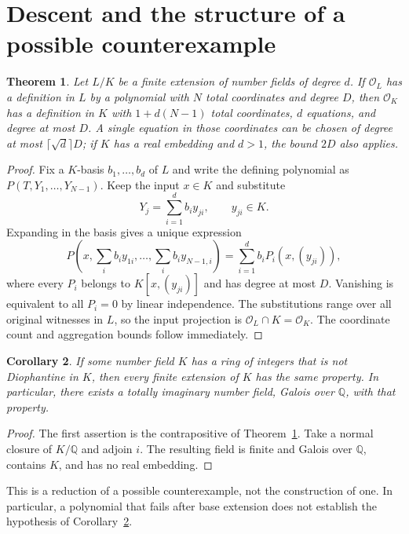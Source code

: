 \documentclass[11pt,a4paper]{article}
\newtheorem{theorem}{Theorem}[section]
\newtheorem{corollary}[theorem]{Corollary}
\theoremstyle{definition}
\newcommand{\Q}{\mathbb Q}
\newcommand{\OK}{\mathcal O_K}
\newcommand{\OL}{\mathcal O_L}
\begin{document}
\section{Descent and the structure of a possible counterexample}

\begin{theorem}\label{thm:descent}
Let $L/K$ be a finite extension of number fields of degree $d$.
If $\OL$ has a definition in $L$ by a polynomial with $N$ total
coordinates and degree $D$, then $\OK$ has a definition in $K$
with $1+d(N-1)$ total coordinates, $d$ equations, and degree at
most $D$. A single equation in those coordinates can be chosen
of degree at most $\lceil\sqrt d\rceil D$; if $K$ has a real
embedding and $d>1$, the bound $2D$ also applies.
\end{theorem}
\begin{proof}
Fix a $K$-basis $b_1,\ldots,b_d$ of $L$ and write the defining
polynomial as $P(T,Y_1,\ldots,Y_{N-1})$.
Keep the input $x\in K$ and substitute
\[
                     Y_j=\sum_{i=1}^d b_i y_{ji},
                     \qquad y_{ji}\in K.
\]
Expanding in the basis gives a unique expression
\[
 P\left(x,\sum_i b_i y_{1i},\ldots,\sum_i b_i y_{N-1,i}\right)
                 =\sum_{i=1}^d b_i P_i(x,(y_{ji})),
\]
where every $P_i$ belongs to $K[x,(y_{ji})]$ and has degree at
most $D$. Vanishing is equivalent to all $P_i=0$ by linear
independence. The substitutions range over all original witnesses
in $L$, so the input projection is $\OL\cap K=\OK$.
The coordinate count and aggregation bounds follow immediately.
\end{proof}

\begin{corollary}\label{cor:counterexample}
If some number field $K$ has a ring of integers that is not
Diophantine in $K$, then every finite extension of $K$ has the
same property. In particular, there exists a totally imaginary
number field, Galois over $\Q$, with that property.
\end{corollary}
\begin{proof}
The first assertion is the contrapositive of
Theorem~\ref{thm:descent}. Take a normal closure of $K/\Q$
and adjoin $i$. The resulting field is finite and Galois over
$\Q$, contains $K$, and has no real embedding.
\end{proof}

This is a reduction of a possible counterexample, not the
construction of one. In particular, a polynomial that fails after
base extension does not establish the hypothesis of
Corollary~\ref{cor:counterexample}.
\end{document}
